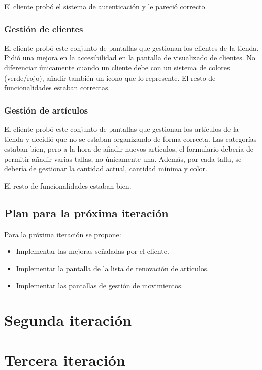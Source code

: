 El cliente probó el sistema de autenticación y le pareció correcto. 

\subsubsection{Gestión de clientes}

El cliente probó este conjunto de pantallas que gestionan los clientes de la tienda. Pidió una mejora en la accesibilidad en la pantalla de visualizado de clientes. No diferenciar únicamente cuando un cliente debe con un sistema de colores (verde/rojo), añadir también un icono que lo represente. El resto de funcionalidades estaban correctas. 

\subsubsection{Gestión de artículos}

El cliente probó este conjunto de pantallas que gestionan los artículos de la tienda y decidió que no se estaban organizando de forma correcta. Las categorías estaban bien, pero a la hora de añadir nuevos artículos, el formulario debería de permitir añadir varias tallas, no únicamente una. Además, por cada talla, se debería de gestionar la cantidad actual, cantidad mínima y color. 

El resto de funcionalidades estaban bien.  


\subsection{Plan para la próxima iteración}

Para la próxima iteración se propone:

\begin{itemize}
	\item Implementar las mejoras señaladas por el cliente.
	\item Implementar la pantalla de la lista de renovación de artículos.
	\item Implementar las pantallas de gestión de movimientos.
\end{itemize}

\section{Segunda iteración}

\section{Tercera iteración}